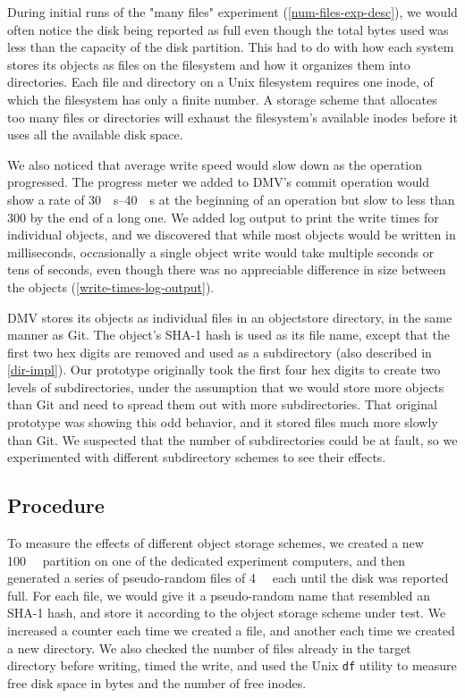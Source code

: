 During initial runs of the "many files" experiment
(\autoref{num-files-exp-desc}), we would often notice the disk being reported as
full even though the total bytes used was less than the capacity of the disk
partition. This had to do with how each system stores its objects as files on
the filesystem and how it organizes them into directories. Each file and
directory on a Unix filesystem requires one \gls{inode}, of which the filesystem
has only a finite number. A storage scheme that allocates too many files or
directories will exhaust the filesystem's available \glspl{inode} before it uses
all the available disk space.

We also noticed that average write speed would slow down as the operation
progressed. The progress meter we added to \gls{DMV}'s \gls{commit} operation
would show a rate of \SIrange{30}{40}{\mib\s} at the beginning of an operation
but slow to less than \SI{300}{\kib} by the end of a long one. We added log
output to print the write times for individual objects, and we discovered that
while most objects would be written in milliseconds, occasionally a single
object write would take multiple seconds or tens of seconds, even though there
was no appreciable difference in size between the objects
(\autoref{write-times-log-output}).

\gls{DMV} stores its objects as individual files in an \gls{objectstore}
directory, in the same manner as Git. The object's SHA-1 hash is used as its
file name, except that the first two hex digits are removed and used as a
subdirectory (also described in \autoref{dir-impl}). Our prototype originally
took the first four hex digits to create two levels of subdirectories, under the
assumption that we would store more objects than Git and need to spread them out
with more subdirectories. That original prototype was showing this odd behavior,
and it stored files much more slowly than Git. We suspected that the number of
subdirectories could be at fault, so we experimented with different subdirectory
schemes to see their effects.

%


\subsection{Procedure}

To measure the effects of different object storage schemes, we created a new
\SI{100}{\mebi\byte} partition on one of the dedicated experiment computers, and
then generated a series of pseudo-random files of \SI{4}{\kibi\byte} each until
the disk was reported full. For each file, we would give it a pseudo-random name
that resembled an SHA-1 hash, and store it according to the object storage
scheme under test. We increased a counter each time we created a file, and
another each time we created a new directory. We also checked the number of
files already in the target directory before writing, timed the write, and used
the Unix \lstinline{df} utility to measure free disk space in bytes and the
number of free \glspl{inode}.

